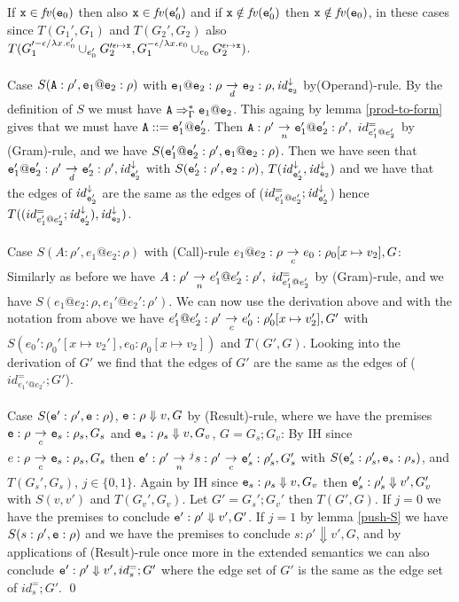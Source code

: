 \documentclass{LMCS}
\newcommand{\eprf}{\qed}
\theoremstyle{definition}\newtheorem{env}[thm]{Environment}
\newcommand{\tosub}[1]{\raisebox{-6.0pt}{$\ \stackrel{\textstyle\to}{\vrule height4.5 pt width0 pt
    depth2.5 pt \smash{\scriptstyle#1}}\ $}}
\begin{document}
If ${\tt x}\in \mathit{fv}({\tt e}_0)$ then also ${\tt x}\in \mathit{fv}({\tt e}_0')$ and if ${\tt x}\notin \mathit{fv}({\tt e}_0')$ then ${\tt x}\notin \mathit{fv}({\tt e}_0)$, in these cases since $T(G_1',G_1)$ and $T(G_2',G_2)$ also $T(G_1'^{-\epsilon/\lambda x.e_0'}\cup_{e_0'} G_2'^{\epsilon\mapsto{\tt x}}, G_1^{-\epsilon/\lambda x.e_0}\cup_{e_0} G_2^{\epsilon\mapsto{\tt x}})$. \\
\\
Case $S({\tt A}:\rho',{\tt e}_1{\tt @e}_2:\rho)$ with ${\tt e}_1{\tt @e}_2:\rho\tosub{d} {\tt e}_2:\rho,{\it id}^\downarrow_{{\tt e}_2} $ by(Operand)-rule. By the definition of $S$ we must have ${\tt A}\Rightarrow_\Gamma^*{\tt e}_1{\tt @e}_2$. This againg by lemma \ref{prod-to-form} gives that we must have ${\tt A}::= {\tt e}_1'{\tt @e}_2'$. Then ${\tt A}:\rho'\tosub{n}{\tt e}_1'{\tt @e}_2':\rho',\ id^=_{ e_1'@e_2'}$ by (Gram)-rule, and we have $S({\tt e}_1'{\tt @e}_2':\rho', {\tt e}_1{\tt @e}_2:\rho)$. Then we have seen that ${\tt e}_1'{\tt @e}_2':\rho'\tosub{d} {\tt e}_2':\rho',{\it id}^\downarrow_{{\tt e}_2'}$ with $S({\tt e}_2':\rho',{\tt e}_2:\rho)$, $T({\it id}^\downarrow_{{\tt e}_2'},{\it id}^\downarrow_{{\tt e}_2})$ and we have that the edges of ${\it id}^\downarrow_{{\tt e}_2'}$ are the same as the edges of ($id^=_{ e_1'@e_2'};{\it id}^\downarrow_{{\tt e}_2'}$) hence $T((id^=_{ e_1'@e_2'};{\it id}^\downarrow_{{\tt e}_2'}),{\it id}^\downarrow_{{\tt e}_2} )$.\\
\\
Case $S(A:\rho',e_1@e_2:\rho)$ with (Call)-rule $e_1@e_2:\rho\tosub{c} e_0:\rho_0[x\mapsto v_2], G$: Similarly as before we have $A:\rho'\tosub{n}e_1'@e_2':\rho',\ id^=_{ e_1'@e_2'}$ by (Gram)-rule, and we have $S(e_1@e_2:\rho, e_1'@e_2':\rho')$. We can now use the derivation above and with the notation from above we have $ e_1'@e_2':\rho'\tosub{c} e_0':\rho_0'[x\mapsto v_2'], G'$ with $S(e_0':\rho_0'[x\mapsto v_2'], e_0:\rho_0[x\mapsto v_2])$ and $T(G',G)$. Looking into the derivation of $G'$ we find that the edges of $G'$ are the same as the edges of ($id^=_{ e_1'@e_2'};G'$).\\
\\
Case $S({\tt e}':\rho',{\tt e}:\rho)$, ${\tt e}:\rho\Downarrow v,G$ by (Result)-rule, where we have the premises ${\tt e}:\rho\tosub{c} {\tt e}_s:\rho_s,G_s$ and ${\tt e}_s:\rho_s\Downarrow v,G_v$, $G=G_s;G_v$: 
By IH since $e:\rho\tosub{c} {\tt e}_s:\rho_s,G_s$ then ${\tt e}':\rho'\tosub{n}^j s:\rho'\tosub{c} {\tt e}_s':\rho_s',G_s'$ with $S({\tt e}_s':\rho_s',{\tt e}_s:\rho_s)$, and $T(G_s',G_s)$, $j\in\{ 0,1\}$. Again by IH since ${\tt e}_s:\rho_s\Downarrow v,G_v$ then ${\tt e}_s':\rho_s'\Downarrow v',G_v'$ with $S(v,v')$ and $T(G_v',G_v)$. Let $G'=G_s';G_v'$ then $T(G',G)$. If $j=0$ we have the premises to conclude ${\tt e}':\rho'\Downarrow v',G'$. If $j=1$ by lemma \ref{push-S} we have $S(s:\rho',{\tt e}:\rho)$ and we have the premises to conclude $s:\rho'\Downarrow v',G$, and by applications of (Result)-rule once more in the extended semantics we can also conclude ${\tt e}':\rho'\Downarrow v', id_s^=;G'$ where the edge set of $G'$ is the same as the edge set of $id_s^=;G'$.
\eprf
\end{document}
